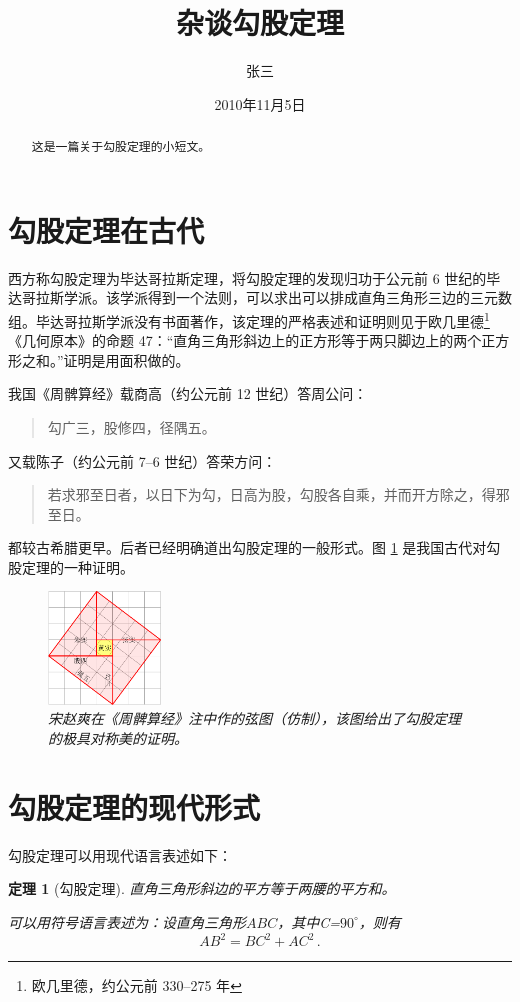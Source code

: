 \documentclass[UTF8,a6paper]{ctexart}
\title{\heiti 杂谈勾股定理}
\author{\kaishu 张三}
\date{2010年11月5日}
\newtheorem{theorem}{定理}
\begin{document}
\maketitle
\begin{abstract}
这是一篇关于勾股定理的小短文。
\end{abstract}
\tableofcontents

\newpage
\section{勾股定理在古代}
\label{sec:ancient}
西方称勾股定理为毕达哥拉斯定理，将勾股定理的发现归功于公元前 6 世纪的毕达哥拉斯学派\cite{kline_gujinshuxue_2002}。该学派得到一个法则，可以求出可以排成直角三角形三边的三元数组。毕达哥拉斯学派没有书面著作，该定理的严格表述和证明则见于欧几里德\footnote{欧几里德，约公元前 330--275 年}《几何原本》的命题 47：“直角三角形斜边上的正方形等于两只脚边上的两个正方形之和。”证明是用面积做的。

我国《周髀算经》载商高（约公元前 12 世纪）答周公问：
\begin{quote}
\kaishu 勾广三，股修四，径隅五。
\end{quote}

又载陈子（约公元前 7--6 世纪）答荣方问：
\begin{quote}
\kaishu 若求邪至日者，以日下为勾，日高为股，勾股各自乘，并而开方除之，得邪至日。
\end{quote}
都较古希腊更早。后者已经明确道出勾股定理的一般形式。图 \ref{fig:xiantu} 是我国古代对勾股定理的一种证明\cite{quanjing_gougu_1998}。
\begin{figure}[ht]
\centering
\includegraphics[width=3cm]{fig/xiantu.pdf}
\caption{\small\it 宋赵爽在《周髀算经》注中作的弦图（仿制），该图给出了勾股定理的极具对称美的证明。}
\label{fig:xiantu}
\end{figure}


\section{勾股定理的现代形式}
勾股定理可以用现代语言表述如下：
\begin{theorem}[勾股定理]
直角三角形斜边的平方等于两腰的平方和。

可以用符号语言表述为：设直角三角形$ABC$，其中\angle C=$90^\circ$，则有
\begin{equation}
\label{eq:gougu}
AB^2=BC^2+AC^2\,.
\end{equation}
\end{theorem}
\end{document}
